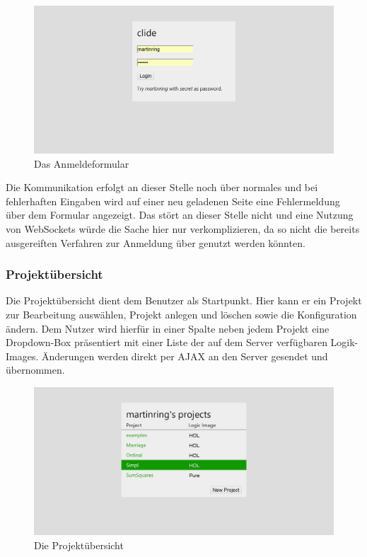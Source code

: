 \begin{figure}[!ht]
\includegraphics[width=\linewidth]{images/screen-login}
  \caption{Das Anmeldeformular}
  \label{fig:screen-login}
\end{figure}

Die Kommunikation erfolgt an dieser Stelle noch über normales  und bei fehlerhaften
Eingaben wird auf einer neu geladenen Seite eine Fehlermeldung über dem Formular angezeigt. Das
stört an dieser Stelle nicht und eine Nutzung von WebSockets würde die Sache hier nur
verkomplizieren, da so nicht die bereits ausgereiften Verfahren zur Anmeldung über 
genutzt werden könnten.

\subsubsection{Projektübersicht}

Die Projektübersicht dient dem Benutzer als Startpunkt. Hier kann er ein Projekt zur Bearbeitung
auswählen, Projekt anlegen und löschen sowie die Konfiguration ändern. Dem Nutzer wird hierfür in
einer Spalte neben jedem Projekt eine Dropdown-Box präsentiert mit einer Liste der auf dem Server
verfügbaren Logik-Images. Änderungen werden direkt per AJAX an den Server gesendet und übernommen.

\begin{figure}[!ht]
\includegraphics[width=\linewidth]{images/screen-projects}
  \caption{Die Projektübersicht}
  \label{fig:screen-projects}
\end{figure}

